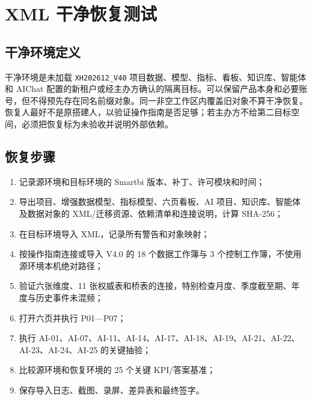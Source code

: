 \documentclass[UTF8,fontset=windows,12pt,openany]{ctexbook}
\newcommand{\Field}[1]{{\small\nolinkurl{#1}}}
\begin{document}
\chapter{XML 干净恢复测试}

\section{干净环境定义}

干净环境是未加载 \Field{XH202612_V40} 项目数据、模型、指标、看板、知识库、智能体和 AIChat 配置的新租户或经主办方确认的隔离目标。可以保留产品本身和必要账号，但不得预先存在同名前缀对象。同一非空工作区内覆盖旧对象不算干净恢复。恢复人最好不是原搭建人，以验证操作指南是否足够；若主办方不给第二目标空间，必须把恢复标为未验收并说明外部依赖。

\section{恢复步骤}

\begin{enumerate}
  \item 记录源环境和目标环境的 Smartbi 版本、补丁、许可模块和时间；
  \item 导出项目、增强数据模型、指标模型、六页看板、AI 项目、知识库、智能体及数据对象的 XML/迁移资源、依赖清单和连接说明，计算 SHA-256；
  \item 在目标环境导入 XML，记录所有警告和对象映射；
  \item 按操作指南连接或导入 V4.0 的 18 个数据工作簿与 3 个控制工作簿，不使用源环境本机绝对路径；
  \item 验证六张维度、11 张权威表和桥表的连接，特别检查月度、季度截至期、年度与历史事件未混频；
  \item 打开六页并执行 P01—P07；
  \item 执行 AI-01、AI-07、AI-11、AI-14、AI-17、AI-18、AI-19、AI-21、AI-22、AI-23、AI-24、AI-25 的关键抽验；
  \item 比较源环境和恢复环境的 25 个关键 KPI/答案基准；
  \item 保存导入日志、截图、录屏、差异表和最终签字。
\end{enumerate}
\end{document}
